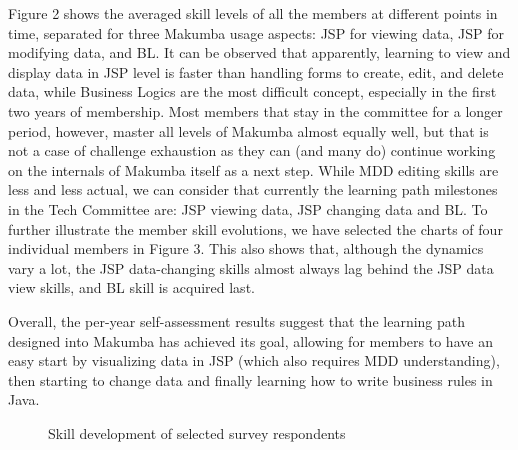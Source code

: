 \documentclass{sig-alt-release2}
\begin{document}
Figure 2 shows the averaged skill levels of all the members at different points in time, separated for three Makumba usage aspects: JSP for viewing data, JSP for modifying data, and BL. It can be observed that apparently, learning to view and display data in JSP level is faster than handling forms to create, edit, and delete data, while Business Logics are the most difficult concept, especially in the first two years of membership. Most members that stay in the committee for a longer period, however, master all levels of Makumba almost equally well, but that is not a case of challenge exhaustion as they can (and many do) continue working on the internals of Makumba itself  as a next step. While MDD editing skills are less and less actual, we can consider that currently the learning path milestones in the Tech Committee are: JSP viewing data, JSP changing data and BL. To further illustrate the member skill evolutions, we have selected the charts of four individual members in Figure 3. This also shows that, although the dynamics vary a lot, the JSP data-changing skills almost always lag behind the JSP data view skills, and BL skill is acquired last. 

Overall, the per-year self-assessment results suggest that the learning path designed into Makumba has achieved its goal, allowing for members to have an easy start by visualizing data in JSP (which also requires MDD understanding), then starting to change data and finally learning how to write business rules in Java.

\begin{figure}
  \label{fig:learning-members}
  \caption{Skill development of selected survey respondents}
\end{figure} 
\end{document}
